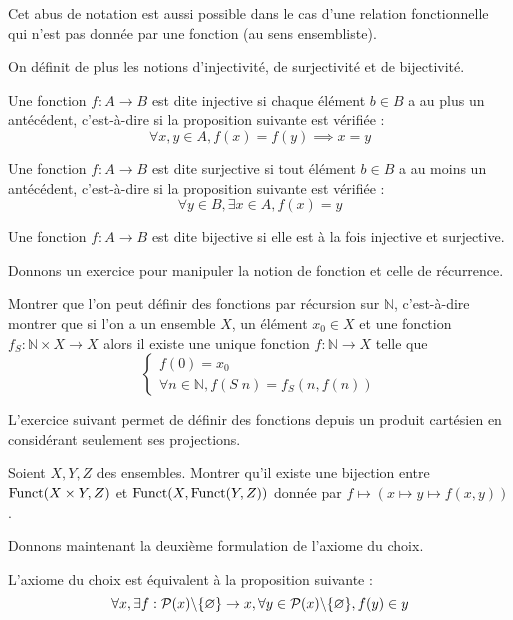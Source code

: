 \begin{remark}
  Cet abus de notation est aussi possible dans le cas d'une relation
  fonctionnelle qui n'est pas donnée par une fonction (au sens ensembliste).
\end{remark}

On définit de plus les notions d'injectivité, de surjectivité et de bijectivité.

\begin{definition}
  Une fonction $f : A \to B$ est dite injective si chaque élément $b\in B$ a au
  plus un antécédent, c'est-à-dire si la proposition suivante est vérifiée :
  \[\forall x,y\in A, f(x) = f(y)\implies x=y\]

  Une fonction $f : A \to B$ est dite surjective si tout élément $b\in B$ a au
  moins un antécédent, c'est-à-dire si la proposition suivante est vérifiée :
  \[\forall y\in B, \exists x \in A, f(x)=y\]

  Une fonction $f : A \to B$ est dite bijective si elle est à la fois injective
  et surjective.
\end{definition}

Donnons un exercice pour manipuler la notion de fonction et celle de récurrence.

\begin{exercise}
  Montrer que l'on peut définir des fonctions par récursion sur $\mathbb N$,
  c'est-à-dire montrer que si l'on a un ensemble $X$, un élément $x_0\in X$ et
  une fonction $f_S : \mathbb N \times X \to X$ alors il existe une unique
  fonction $f : \mathbb N \to X$ telle que
  \[\begin{cases}
  f(0) = x_0\\
  \forall n \in \mathbb N, f(S\;n) = f_S(n,f(n))
  \end{cases}\]
\end{exercise}

L'exercice suivant permet de définir des fonctions depuis un produit cartésien
en considérant seulement ses projections.

\begin{exercise}
  Soient $X,Y,Z$ des ensembles. Montrer qu'il existe une bijection entre
  $\operatorname{Funct}(X\times Y,Z)$ et $\operatorname{Funct}(X,\operatorname{Funct}(Y,Z))$ donnée par
  $f\mapsto (x\mapsto y \mapsto f(x,y))$.
\end{exercise}

Donnons maintenant la deuxième formulation de l'axiome du choix.

\begin{proposition}
  L'axiome du choix est équivalent à la proposition suivante :
  \[\forall x, \exists f : \mathcal{P} (x) \backslash \{\varnothing\} \to x,
  \forall y \in \mathcal{P}(x)\backslash \{\varnothing\}, f(y)\in y\]
\end{proposition}

